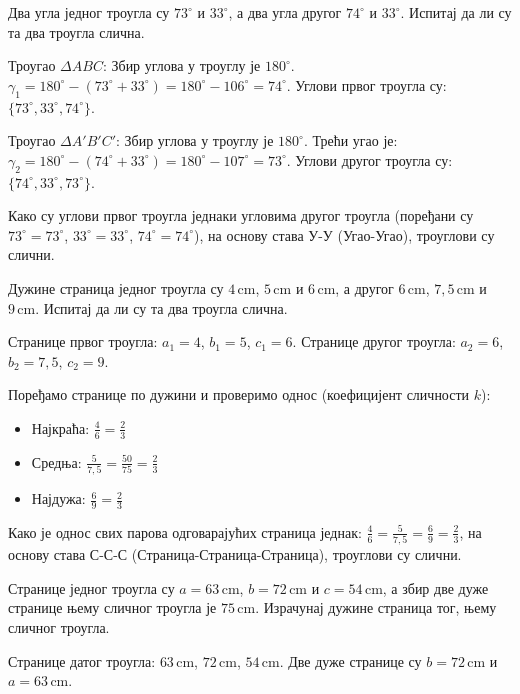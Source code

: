 \documentclass[10pt,a5paper,addpoints,answers]{exam}
\def\measure#1#2{#1 \, \mathrm{#2}}
\begin{document}
\begin{questions}

\question[3]
 Два угла једног троугла су
 $73^\circ$ и
 $33^\circ$, а два угла другог
 $74^\circ$ и
 $33^\circ$.
 Испитај да ли су та два троугла слична.
 \begin{solution}[\stretch 4] %
  Троугао $\Delta ABC$:
  Збир углова у троуглу је $180^\circ$.
  $\gamma_1 = 180^\circ - (73^\circ + 33^\circ) = 180^\circ - 106^\circ = 74^\circ$.
  Углови првог троугла су: $\{73^\circ, 33^\circ, 74^\circ\}$.

  Троугао $\Delta A'B'C'$:
  Збир углова у троуглу је $180^\circ$.
  Трећи угао је: $\gamma_2 = 180^\circ - (74^\circ + 33^\circ) = 180^\circ - 107^\circ = 73^\circ$.
  Углови другог троугла су: $\{74^\circ, 33^\circ, 73^\circ\}$.

  Како су углови првог троугла једнаки угловима другог троугла (поређани су $73^\circ=73^\circ$, $33^\circ=33^\circ$, $74^\circ=74^\circ$), на основу става У-У (Угао-Угао),
  троуглови су слични.
 \end{solution}
 \answerline

\ifprintanswers\else\newpage\fi %

\question[3]
 Дужине страница једног троугла су
 $\measure{4}{cm}$,
 $\measure{5}{cm}$ и
 $\measure{6}{cm}$, а другог
 $\measure{6}{cm}$,
 $\measure{7{,}5}{cm}$ и
 $\measure{9}{cm}$.
 Испитај да ли су та два троугла слична.
 \begin{solution}[\stretch 4] %
  Странице првог троугла: $a_1=4$, $b_1=5$, $c_1=6$.
  Странице другог троугла: $a_2=6$, $b_2=7{,}5$, $c_2=9$.

  Поређамо странице по дужини и проверимо однос (коефицијент сличности $k$):
  \begin{itemize}
      \item Најкраћа: $\frac{4}{6} = \frac{2}{3}$
      \item Средња: $\frac{5}{7{,}5} = \frac{50}{75} = \frac{2}{3}$
      \item Најдужа: $\frac{6}{9} = \frac{2}{3}$
  \end{itemize}
  Како је однос свих парова одговарајућих страница једнак: $\frac{4}{6} = \frac{5}{7{,}5} = \frac{6}{9} = \frac{2}{3}$, на основу става С-С-С (Страница-Страница-Страница),
  троуглови су слични.
 \end{solution}
 \answerline

\question[4]
 Странице једног троугла су
 $a = \measure{63}{cm}$,
 $b = \measure{72}{cm}$ и
 $c = \measure{54}{cm}$,
 а збир две дуже
 странице њему сличног троугла је
 $\measure{75}{cm}$.
 Израчунај дужине страница тог, њему сличног троугла.
 \begin{solution}[\stretch 8] %
  Странице датог троугла: $63\,\mathrm{cm}$, $72\,\mathrm{cm}$, $54\,\mathrm{cm}$.
  Две дуже странице су $b=72\,\mathrm{cm}$ и $a=63\,\mathrm{cm}$.


\end{solution}
\end{questions}
\end{document}
